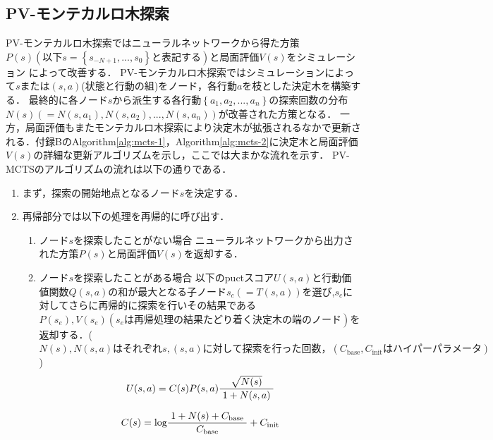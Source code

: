\subsection{PV-モンテカルロ木探索}
PV-モンテカルロ木探索ではニューラルネットワークから得た方策$P(s)(以下s=\left\{ s_{-N+1}, ..., s_0 \right\}と表記する)$と局面評価$V(s)$をシミュレーション
によって改善する．
PV-モンテカルロ木探索ではシミュレーションによって$s$または$(s, a)$(状態と行動の組)をノード，各行動$a$を枝とした決定木を構築する．
最終的に各ノード$s$から派生する各行動$\left\{a_1, a_2, ..., a_n\right\}$の探索回数の分布$N(s)(={N(s, a_1), N(s, a_2), ..., N(s, a_n)})$が改善された方策となる．
一方，局面評価もまたモンテカルロ木探索により決定木が拡張されるなかで更新される．付録BのAlgorithm\ref{alg:mcts-1}，Algorithm\ref{alg:mcts-2}に決定木と局面評価$V(s)$の詳細な更新アルゴリズムを示し，ここでは大まかな流れを示す．
PV-MCTSのアルゴリズムの流れは以下の通りである．

\begin{enumerate}
    \item まず，探索の開始地点となるノード$s$を決定する．
    \item 再帰部分では以下の処理を再帰的に呼び出す．
    \begin{enumerate}
        \item ノード$s$を探索したことがない場合
        ニューラルネットワークから出力された方策$P(s)$と局面評価$V(s)$を返却する．
        \item ノード$s$を探索したことがある場合
        以下のpuctスコア$U(s, a)$と行動価値関数$Q(s, a)$の和が最大となる子ノード$s_c(=T(s, a))$を選び,$s_c$に対してさらに再帰的に探索を行いその結果である$P(s_e), V(s_e)(s_eは再帰処理の結果たどり着く
        決定木の端のノード)$を返却する．($N(s), N(s, a)はそれぞれs,(s, a)に対して探索を行った回数，  (C_{\textrm{base}}, C_{\textrm{init}}はハイパーパラメータ)$)
        \begin{equation}
            {U(s, a)= C(s)P(s, a)\frac{\sqrt{N(s)}}{1+N(s, a)}\\
            }
        \end{equation}
        
        \begin{equation}
            {C(s)=\textrm{log}\frac{1+N(s)+C_{\textrm{base}}}{C_{\textrm{base}}}+C_{\textrm{init}}\\
           }
        \end{equation}
    \end{enumerate}
\end{enumerate}


